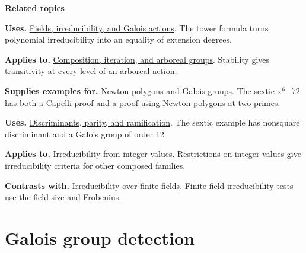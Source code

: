 \documentclass[11pt,a4paper,oneside,openany]{book}
\begin{document}
\par\medskip\begingroup\footnotesize\setlength{\parskip}{1pt}\textbf{\sffamily\color{atlasgreen}Related topics}\par
\color{black}\textbf{Uses.} \hyperlink{article:foundations}{Fields, irreducibility, and Galois actions}. The tower formula turns polynomial irreducibility into an equality of extension degrees.\par
\color{black}\textbf{Applies to.} \hyperlink{article:composition-iteration}{Composition, iteration, and arboreal groups}. Stability gives transitivity at every level of an arboreal action.\par
\color{black}\textbf{Supplies examples for.} \hyperlink{article:newton-polygons}{Newton polygons and Galois groups}. The sextic x\ensuremath{{}^6}\ensuremath{-}72 has both a Capelli proof and a proof using Newton polygons at two primes.\par
\color{black}\textbf{Uses.} \hyperlink{article:discriminants}{Discriminants, parity, and ramification}. The sextic example has nonsquare discriminant and a Galois group of order 12.\par
\color{black}\textbf{Applies to.} \hyperlink{article:integer-values}{Irreducibility from integer values}. Restrictions on integer values give irreducibility criteria for other composed families.\par
\color{black}\textbf{Contrasts with.} \hyperlink{article:finite-field-irreducibility}{Irreducibility over finite fields}. Finite-field irreducibility tests use the field size and Frobenius.\par
\endgroup
\part{Galois group detection}
\end{document}
